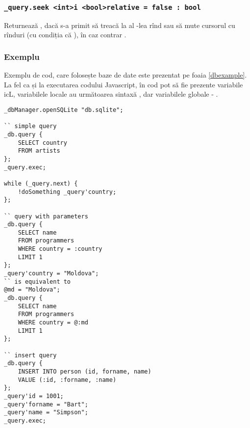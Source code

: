 \subsubsection{\lstinline|_query.seek <int>i <bool>relative = false : bool|}

Returnează \true, dacă s-a primit să treacă la al -lea rînd sau să mute cursorul cu  rînduri (cu condiția că ), în caz contrar \false.

\subsubsection{Exemplu}

Exemplu de cod, care folosește baze de date este prezentat pe foaia \ref{dbexample}. La fel ca și la executarea codului Javascript, în cod pot să fie prezente variabile icL, variabilele locale au următoarea sintaxă , dar variabilele globale - .

\newpage
\begin{lstlisting}[caption=Exemplu de cod care folosește baze de date, label=dbexample]
_dbManager.openSQLite "db.sqlite";

`` simple query
_db.query {
	SELECT country
	FROM artists
};
_query.exec;

while (_query.next) {
	!doSomething _query'country;
};

`` query with parameters
_db.query {
	SELECT name
	FROM programmers
	WHERE country = :country
	LIMIT 1
};
_query'country = "Moldova";
`` is equivalent to
@md = "Moldova";
_db.query {
	SELECT name
	FROM programmers
	WHERE country = @:md
	LIMIT 1
};

`` insert query
_db.query {
	INSERT INTO person (id, forname, name)
	VALUE (:id, :forname, :name)
};
_query'id = 1001;
_query'forname = "Bart";
_query'name = "Simpson";
_query.exec;
\end{lstlisting}

